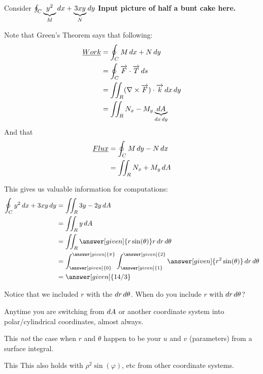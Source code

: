 \documentclass{ximera}
\begin{document}
\begin{example}
Consider $\oint_C \underbrace{y^2}_M \mathop{}\!d x + \underbrace{3xy}_N \mathop{}\!d y$  {\bf Input picture of half a bunt cake here.}

Note that Green's Theorem says that following:
    \begin{align*}
     \underline{Work} &= \oint_C M \d x + N \d y \\
     &= \oint_C \overrightarrow{F}\cdot \overrightarrow{T} \d s\\
     &= \iint_R (\nabla\times \overrightarrow{F}) \cdot \overrightarrow{k} \d x \d y \\
     &= \iint_R N_x - M_y \underbrace{\d A}_{\d x \d y}
    \end{align*}
And that 
    \begin{align*}
     \underline{Flux} &= \oint_C M \mathop{}\!d y - N \mathop{}\!d x \\
     &= \iint_R N_x + M_y \mathop{}\!d A
    \end{align*}

This gives us valuable information for computations:
    \begin{align*}
     \oint_C y^2 \d x + 3xy \d y &= \iint_R 3y - 2y \d A\\
     &= \iint_R y \d A \\
     &= \iint_R \answer[given]{ r \sin(\theta)} r \d r \d \theta \\ 
     &= \int_{\answer[given]{0}}^{\answer[given]{\pi}} \int_{\answer[given]{1}}^{\answer[given]{2}} \answer[given]{ r^2 \sin(\theta)} \d r \d \theta \\ 
     &= \answer[given]{14/3}
    \end{align*}

\end{example}

\begin{question}
Notice that we included $r$ with the $\mathop{}\!d r \mathop{}\!d \theta$. When do you include $r$ with $\mathop{}\!d r \mathop{}\!d \theta$?
\begin{freeResponse}

\end{freeResponse}
\begin{feedback}
Anytime you are switching from $\mathop{}\!d A$ or another coordinate system into polar/cylindrical coordinates, almost always.

This {\it not} the case when $r$ and $\theta$ happen to be your $u$ and $v$ (parameters) from a surface integral.

This This also holds with $\rho^2\sin(\varphi)$, etc from other coordinate systems.
\end{feedback}
\end{question}
\end{document}
